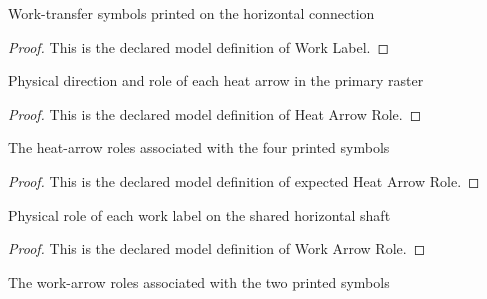 \begin{definition}
  \label{def:physics:phyx-mini-0424:phyxminiproblems-problemphyxmini0424-worklabel}
  Work-transfer symbols printed on the horizontal connection
\end{definition}
\begin{proof}
  This is the declared model definition of Work Label.
\end{proof}
\begin{definition}
  \label{def:physics:phyx-mini-0424:phyxminiproblems-problemphyxmini0424-heatarrowrole}
  Physical direction and role of each heat arrow in the primary raster
\end{definition}
\begin{proof}
  This is the declared model definition of Heat Arrow Role.
\end{proof}
\begin{definition}
  \label{def:physics:phyx-mini-0424:phyxminiproblems-problemphyxmini0424-expectedheatarrowrole}
  The heat-arrow roles associated with the four printed symbols
\end{definition}
\begin{proof}
  This is the declared model definition of expected Heat Arrow Role.
\end{proof}
\begin{definition}
  \label{def:physics:phyx-mini-0424:phyxminiproblems-problemphyxmini0424-workarrowrole}
  Physical role of each work label on the shared horizontal shaft
\end{definition}
\begin{proof}
  This is the declared model definition of Work Arrow Role.
\end{proof}
\begin{definition}
  \label{def:physics:phyx-mini-0424:phyxminiproblems-problemphyxmini0424-expectedworkarrowrole}
  The work-arrow roles associated with the two printed symbols
\end{definition}
